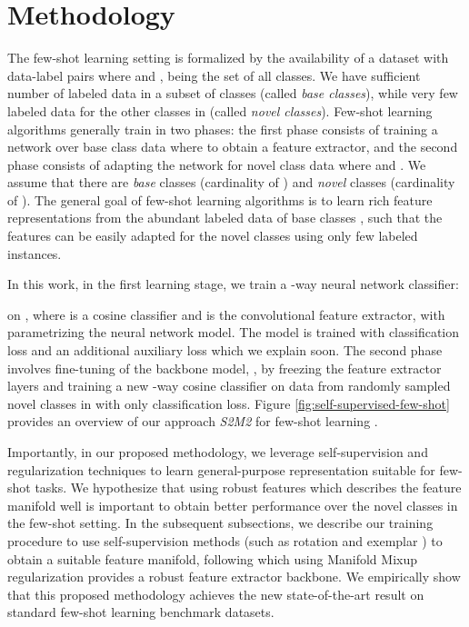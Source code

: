 \documentclass[10pt,twocolumn,letterpaper]{article}
\begin{document}
\section{Methodology}\label{methodology}
\vspace{-3pt}
The few-shot learning setting is formalized by the availability of a dataset with data-label pairs  where  and ,  being the set of all classes. We have sufficient number of labeled data in a subset of  classes (called \textit{base classes}), while very few labeled data for the other classes in  (called \textit{novel classes}).
Few-shot learning algorithms generally train in two phases: the first phase consists of training a network over base class data  where  to obtain a feature extractor, and the second phase consists of adapting the network for novel class data  where  and . We assume that there are  \textit{base} classes (cardinality of ) and  \textit{novel} classes (cardinality of ). The general goal of few-shot learning algorithms is to learn rich feature representations from the abundant labeled data of base classes , such that the features can be easily adapted for the novel classes using only few labeled instances.

In this work, in the first learning stage, we train a -way neural network classifier:

on , where  is a cosine classifier \cite{fewshot2018cc,fewshot2018cc2} and  is the convolutional feature extractor, with  parametrizing the neural network model. The model is trained with classification loss and an additional auxiliary loss which we explain soon. The second phase involves fine-tuning of the backbone model, , by freezing the feature extractor layers and training a new -way cosine classifier  on data from  randomly sampled novel classes in  with only classification loss. Figure \ref{fig:self-supervised-few-shot} provides an overview of our approach \textit{S2M2} for few-shot learning .






Importantly, in our proposed methodology, we leverage self-supervision and regularization techniques \cite{verma2019manifold,Spyros2018rotate,exemplar2014} to learn general-purpose representation suitable for few-shot tasks. We hypothesize that using robust features which describes the feature manifold well is important to obtain better performance over the novel classes in the few-shot setting. In the subsequent subsections, we describe our training procedure to use self-supervision methods (such as rotation \cite{Spyros2018rotate} and exemplar \cite{exemplar2014}) to obtain a suitable feature manifold, following which using Manifold Mixup regularization \cite{verma2019manifold} provides a robust feature extractor backbone. We empirically show that this proposed methodology achieves the new state-of-the-art result on standard few-shot learning benchmark datasets.
\end{document}
